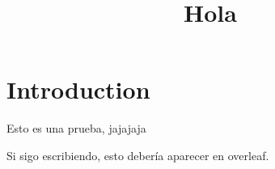 \documentclass[]{article}
\title{Hola}
\begin{document}
    \section{Introduction}
    Esto es una prueba, jajajaja

    Si sigo escribiendo, esto debería aparecer en overleaf.
\end{document}
